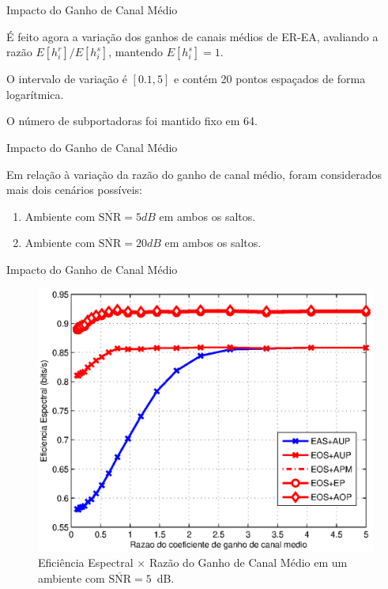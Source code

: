 \begin{frame}{Impacto do Ganho de Canal Médio}
   \begin{bigitem}
      \item É feito agora a variação dos ganhos de canais médios de ER-EA, avaliando a razão $E[h^r_i]/E[h^s_i]$, mantendo $E[h^s_i] = 1$.
      \item O intervalo de variação é $[0.1,5]$ e contém 20 pontos espaçados de forma logarítmica.
      \item O número de subportadoras foi mantido fixo em 64.
   \end{bigitem}
\end{frame}

\begin{frame}{Impacto do Ganho de Canal Médio}
   \begin{bigitem}
      \item Em relação à variação da razão do ganho de canal médio, foram considerados mais dois cenários possíveis:
        \begin{enumerate}[\noindent i)]
           \item Ambiente com $\overline{\text{SNR}} = 5dB$ em ambos os saltos.
           \item Ambiente com $\overline{\text{SNR}} = 20dB$ em ambos os saltos.
        \end{enumerate}
   \end{bigitem}
\end{frame}

\begin{frame}{Impacto do Ganho de Canal Médio}
   \begin{figure}[!htb]
     \centering
     \includegraphics[width=0.6\linewidth]{../Imagens/CGxSE-5dB.eps}
     \caption{Eficiência Espectral $\times$ Razão do Ganho de Canal Médio em um ambiente com $\overline{\text{SNR}} = 5$~dB.}\label{fig:CGxSE-5dB}
   \end{figure}   
\end{frame}

